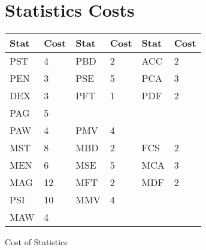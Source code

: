 \section{Statistics Costs}

\begin{SHTable}[h]
	\begin{tabular}{llllll}
    Stat & Cost	&	Stat& Cost	& Stat	& Cost \\
\hline
	PST  & 4	&	PBD	&	2	&	ACC	&	2	\\
	PEN  & 3 	&	PSE	&	5	&	PCA	&	3	\\
	DEX  & 3	&	PFT	&	1	&	PDF	&	2	\\
	PAG  & 5	&		&		&		&		\\ 
	PAW	 & 4	&	PMV	&	4	&		&		\\
\hline	
	MST  & 8	&	MBD	&	2	&	FCS	&	2	\\
	MEN  & 6	&	MSE	&	5	&	MCA	&	3	\\
	MAG  & 12	&	MFT	&	2	&	MDF	&	2	\\
	PSI  & 10	&	MMV	&	4	&		&		\\ 
	MAW	 & 4	&		&		&		&		\\ 
	\end{tabular}
    \caption{Cost of Statistics}\label{Table:StatCosts}
\end{SHTable}


